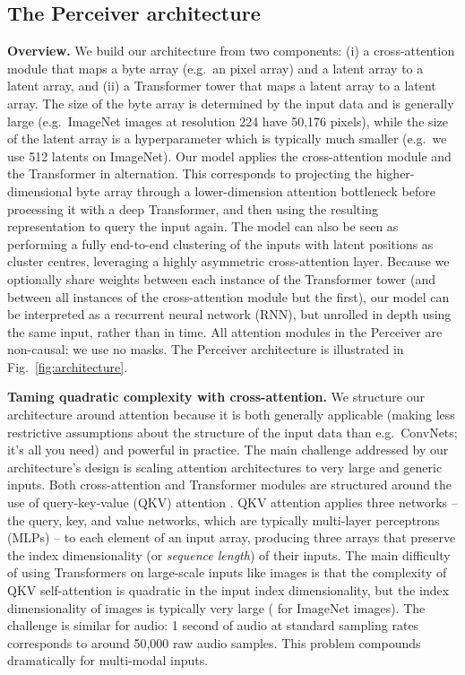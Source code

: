 \documentclass{article}
\begin{document}
\subsection{The Perceiver architecture}

\noindent \textbf{Overview.} We build our architecture from two components: (i) a cross-attention module that maps a byte array (e.g.\ an pixel array) and a latent array to a latent array, and (ii) a Transformer tower that maps a latent array to a latent array. The size of the byte array is determined by the input data and is generally large (e.g.\ ImageNet images at resolution 224 have 50,176 pixels), while the size of the latent array is a hyperparameter which is typically much smaller (e.g.\ we use 512 latents on ImageNet). Our model applies the cross-attention module and the Transformer in alternation. This corresponds to projecting the higher-dimensional byte array through a lower-dimension attention bottleneck before processing it with a deep Transformer, and then using the resulting representation to query the input again. The model can also be seen as performing a fully end-to-end clustering of the inputs with latent positions as cluster centres, leveraging a highly asymmetric cross-attention layer. Because we optionally share weights between each instance of the Transformer tower (and between all instances of the cross-attention module but the first), our model can be interpreted as a recurrent neural network (RNN), but unrolled in depth using the same input, rather than in time. All attention modules in the Perceiver are non-causal: we use no masks. The Perceiver architecture is illustrated in Fig.~\ref{fig:architecture}.

\noindent \textbf{Taming quadratic complexity with cross-attention.} We structure our architecture around attention because it is both generally applicable (making less restrictive assumptions about the structure of the input data than e.g.\ ConvNets; it's all you need) and powerful in practice. The main challenge addressed by our architecture's design is scaling attention architectures to very large and generic inputs. Both cross-attention and Transformer modules are structured around the use of query-key-value (QKV) attention \cite{graves2014neural,weston2014memory,bahdanau2015neural}. QKV attention applies three networks -- the query, key, and value networks, which are typically multi-layer perceptrons (MLPs) -- to each element of an input array, producing three arrays that preserve the index dimensionality (or \textit{sequence length})  of their inputs. The main difficulty of using Transformers on large-scale inputs like images is that the complexity of QKV self-attention is quadratic in the input index dimensionality, but the index dimensionality  of images is typically very large ( for  ImageNet images). The challenge is similar for audio: 1 second of audio at standard sampling rates corresponds to around 50,000 raw audio samples. This problem compounds dramatically for multi-modal inputs.
\end{document}
